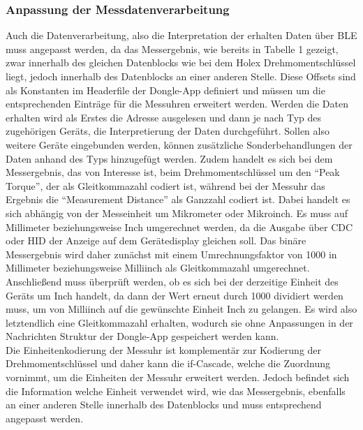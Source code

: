 \subsubsection{Anpassung der Messdatenverarbeitung}
Auch die Datenverarbeitung, also die Interpretation der erhalten Daten über \ac{BLE} muss angepasst werden, da das Messergebnis, wie bereits in Tabelle 1 gezeigt, zwar innerhalb des gleichen Datenblocks wie bei dem Holex Drehmomentschlüssel liegt, jedoch innerhalb des Datenblocks an einer anderen Stelle. Diese Offsets sind als Konstanten im Headerfile der Dongle-App definiert und müssen um die entsprechenden Einträge für die Messuhren erweitert werden. Werden die Daten erhalten wird als Erstes die Adresse ausgelesen und dann je nach Typ des zugehörigen Geräts, die Interpretierung der Daten durchgeführt. Sollen also weitere Geräte eingebunden werden, können zusätzliche Sonderbehandlungen der Daten anhand des Typs hinzugefügt werden. Zudem handelt es sich bei dem Messergebnis, das von Interesse ist, beim Drehmomentschlüssel um den ``Peak Torque'', der als Gleitkommazahl codiert ist, während bei der Messuhr das Ergebnis die ``Measurement Distance'' als Ganzzahl codiert ist. Dabei handelt es sich abhängig von der Messeinheit um Mikrometer oder Mikroinch. Es muss auf Millimeter beziehungsweise Inch umgerechnet werden, da die Ausgabe über CDC oder \ac{HID} der Anzeige auf dem Gerätedisplay gleichen soll. Das binäre Messergebnis wird daher zunächst mit einem Umrechnungsfaktor von 1000 in Millimeter beziehungsweise Milliinch als Gleitkommazahl umgerechnet. Anschließend muss überprüft werden, ob es sich bei der derzeitige Einheit des Geräts um Inch handelt, da dann der Wert erneut durch 1000 dividiert werden muss, um von Milliinch auf die gewünschte Einheit Inch zu gelangen. Es wird also letztendlich eine Gleitkommazahl erhalten, wodurch sie ohne Anpassungen in der Nachrichten Struktur der Dongle-App gespeichert werden kann.\\
Die Einheitenkodierung der Messuhr ist komplementär zur Kodierung der Drehmomentschlüssel und daher kann die if-Cascade, welche die Zuordnung vornimmt, um die Einheiten der Messuhr erweitert werden. Jedoch befindet sich die Information welche Einheit verwendet wird, wie das Messergebnis, ebenfalls an einer anderen Stelle innerhalb des Datenblocks und muss entsprechend angepasst werden.

